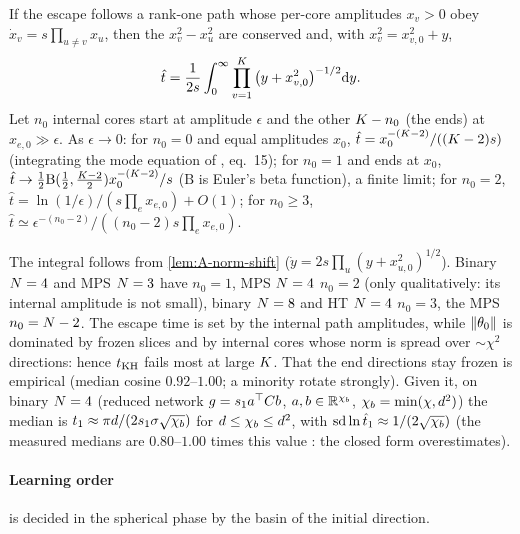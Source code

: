 \begin{proposition}\label{prop:A-product-mode}
  \derived{} 
  If the escape follows a rank-one path whose per-core amplitudes $x_v>0$ obey
  $\dot x_v=s\prod_{u\ne v}x_u$, then the $x_v^2-x_u^2$ are conserved and, with $x_v^2=x_{v,0}^2+y$,
  \begin{equation}\label{eq:A-product-mode}
    \hat t=\frac1{2s}\int_0^\infty\prod_{v=1}^{K}\big(y+x_{v,0}^2\big)^{-1/2}\mathrm{d} y .
  \end{equation}
  Let $n_0$ internal cores start at amplitude $\epsilon$ and the other $K-n_0$ (the ends) at $x_{e,0}\gg\epsilon$.
  As $\epsilon\to0$: for $n_0=0$ and equal amplitudes $x_0$, $\hat t=x_0^{-(K-2)}/((K-2)s)$ (integrating the
  mode equation of \citealp{saxe2014exact}, eq.~15); for $n_0=1$ and ends at $x_0$,
  $\hat t\to\frac12\mathrm{B}(\frac12,\frac{K-2}2)x_0^{-(K-2)}/s$ ($\mathrm B$ is Euler's beta function), a finite
  limit; for $n_0=2$, $\hat t=\ln(1/\epsilon)/(s\prod_ex_{e,0})+O(1)$; for $n_0\ge3$,
  $\hat t\simeq\epsilon^{-(n_0-2)}/((n_0-2)s\prod_ex_{e,0})$.
\end{proposition}
The integral follows from \cref{lem:A-norm-shift} ($\dot y=2s\prod_u(y+x_{u,0}^2)^{1/2}$). Binary $N=4$ and MPS
$N=3$ have $n_0=1$, MPS $N=4$ $n_0=2$ (only qualitatively: its internal amplitude is not small), binary $N=8$
and HT $N=4$ $n_0=3$, the MPS $n_0=N-2$. The escape time is set by the internal path amplitudes, while
$\lVert\theta_0\rVert$ is dominated by frozen slices and by internal cores whose norm is spread over $\sim\chi^2$
directions: hence $t_{\rm KH}$ fails most at large $K$. That the end directions stay frozen is empirical
(median cosine $0.92$--$1.00$; a minority rotate strongly). Given it, on binary $N=4$ (reduced network
$g=s_{1}a^{\top} Cb$, $a,b\in\mathbb{R}^{\chi_{b}}$, $\chi_{b}=\min(\chi,d^2)$) the median is $t_{1}\approx\pi d/(2s_{1}\sigma\sqrt{\chi_{b}})$ for
$d\le\chi_{b}\le d^2$, with $\mathrm{sd}\ln\hat t_1\approx1/(2\sqrt{\chi_{b}})$ \derived{} \newresult{} (the measured medians
are $0.80$--$1.00$ times this value \empirical: the closed form overestimates).

\paragraph{Learning order} is decided in the spherical phase by the basin of the initial direction.

